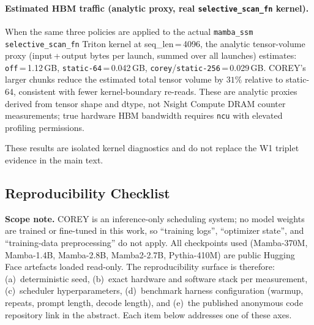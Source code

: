 \paragraph{Estimated HBM traffic (analytic proxy, real \texttt{selective\_scan\_fn} kernel).}
When the same three policies are applied to the actual \texttt{mamba\_ssm} \texttt{selective\_scan\_fn} Triton kernel at seq\_len\,=\,4096, the analytic tensor-volume proxy (input\,+\,output bytes per launch, summed over all launches) estimates: \texttt{off}\,=\,1.12\,GB, \texttt{static-64}\,=\,0.042\,GB, \texttt{corey}/\texttt{static-256}\,=\,0.029\,GB.
COREY's larger chunks reduce the estimated total tensor volume by $31\%$ relative to static-64, consistent with fewer kernel-boundary re-reads.
These are analytic proxies derived from tensor shape and dtype, not Nsight Compute DRAM counter measurements; true hardware HBM bandwidth requires \texttt{ncu} with elevated profiling permissions.

These results are isolated kernel diagnostics and do not replace the W1 triplet evidence in the main text.

\subsection{Reproducibility Checklist}
\textbf{Scope note.} COREY is an inference-only scheduling system; no model
weights are trained or fine-tuned in this work, so ``training logs'',
``optimizer state'', and ``training-data preprocessing'' do not apply.
All checkpoints used (Mamba-370M, Mamba-1.4B, Mamba-2.8B, Mamba2-2.7B,
Pythia-410M) are public Hugging Face artefacts loaded read-only.
The reproducibility surface is therefore: (a)~deterministic seed,
(b)~exact hardware and software stack per measurement, (c)~scheduler
hyperparameters, (d)~benchmark harness configuration (warmup, repeats,
prompt length, decode length), and (e)~the published anonymous code
repository link in the abstract.  Each item below addresses one of
these axes.

